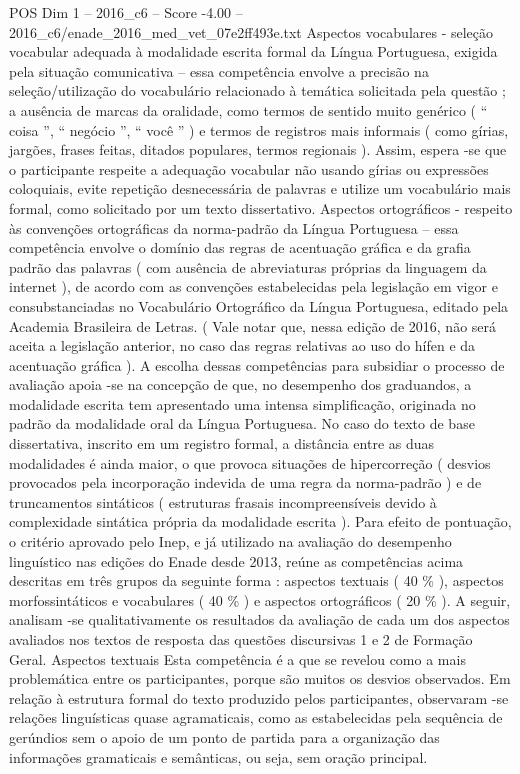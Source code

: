 \begin{textsample}{POS Dim 1 – 2016\_c6 – Score -4.00 – 2016\_c6/enade\_2016\_med\_vet\_07e2ff493e.txt}
Aspectos vocabulares - seleção vocabular adequada à modalidade escrita formal da Língua Portuguesa, exigida pela situação comunicativa – essa competência envolve a precisão na seleção/utilização do vocabulário relacionado à temática solicitada pela questão ; a ausência de marcas da oralidade, como termos de sentido muito genérico ( “ coisa ”, “ negócio ”, “ você ” ) e termos de registros mais informais ( como gírias, jargões, frases feitas, ditados populares, termos regionais ).
Assim, espera -se que o participante respeite a adequação vocabular não usando gírias ou expressões coloquiais, evite repetição desnecessária de palavras e utilize um vocabulário mais formal, como solicitado por um texto dissertativo.
Aspectos ortográficos - respeito às convenções ortográficas da norma-padrão da Língua Portuguesa – essa competência envolve o domínio das regras de acentuação gráfica e da grafia padrão das palavras ( com ausência de abreviaturas próprias da linguagem da internet ), de acordo com as convenções estabelecidas pela legislação em vigor e consubstanciadas no Vocabulário Ortográfico da Língua Portuguesa, editado pela Academia Brasileira de Letras. ( Vale notar que, nessa edição de 2016, não será aceita a legislação anterior, no caso das regras relativas ao uso do hífen e da acentuação gráfica ).
A escolha dessas competências para subsidiar o processo de avaliação apoia -se na concepção de que, no desempenho dos graduandos, a modalidade escrita tem apresentado uma intensa simplificação, originada no padrão da modalidade oral da Língua Portuguesa.
No caso do texto de base dissertativa, inscrito em um registro formal, a distância entre as duas modalidades é ainda maior, o que provoca situações de hipercorreção ( desvios provocados pela incorporação indevida de uma regra da norma-padrão ) e de truncamentos sintáticos ( estruturas frasais incompreensíveis devido à complexidade sintática própria da modalidade escrita ).
Para efeito de pontuação, o critério aprovado pelo Inep, e já utilizado na avaliação do desempenho linguístico nas edições do Enade desde 2013, reúne as competências acima descritas em três grupos da seguinte forma : aspectos textuais ( 40 \% ), aspectos morfossintáticos e vocabulares ( 40 \% ) e aspectos ortográficos ( 20 \% ).
A seguir, analisam -se qualitativamente os resultados da avaliação de cada um dos aspectos avaliados nos textos de resposta das questões discursivas 1 e 2 de Formação Geral.
Aspectos textuais Esta competência é a que se revelou como a mais problemática entre os participantes, porque são muitos os desvios observados.
Em relação à estrutura formal do texto produzido pelos participantes, observaram -se relações linguísticas quase agramaticais, como as estabelecidas pela sequência de gerúndios sem o apoio de um ponto de partida para a organização das informações gramaticais e semânticas, ou seja, sem oração principal.

\end{textsample}
